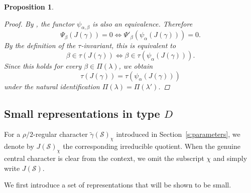 \documentclass{amsart}
\newtheorem{prop}[thm]{Proposition}
\theoremstyle{definition}
\begin{document}
\begin{prop}
\begin{proof}
By \cite[Proposition 7.3.3]{V81}, the functor $\psi_{\alpha,\beta}$ is also an equivalence. Therefore
\begin{equation*}
\Psi_\beta(J(\gamma))=0
\iff
\Psi'_\beta(\psi_\alpha(J(\gamma)))=0.
\end{equation*}
By the definition of the $\tau$-invariant, this is equivalent to
\begin{equation*}
\beta\in\tau(J(\gamma))
\iff
\beta\in\tau(\psi_\alpha(J(\gamma))).
\end{equation*}
Since this holds for every $\beta\in\Pi(\lambda)$, we obtain
\begin{equation*}
\tau(J(\gamma))=\tau(\psi_\alpha(J(\gamma)))
\end{equation*}
under the natural identification $\Pi(\lambda)=\Pi(\lambda')$.
\end{proof}


\end{prop}

\subsection{Small representations in type \(D\)}

For a \(\rho/2\)-regular character
\(\widetilde\gamma(\mathcal S)_\chi\) introduced in
Section~\ref{s:parameters}, we denote by
$J(\mathcal S)_\chi$
the corresponding irreducible quotient. 
When the genuine central
character is clear from the context, we omit the subscript \(\chi\)
and simply write \(J(\mathcal S)\).

We first introduce a set of
representations that will be shown to be small.
\end{document}
